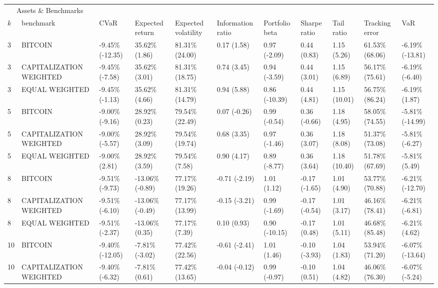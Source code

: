 \documentclass{article}
\begin{document}
\begin{landscape}
\begin{table}[H]
  \centering
  \begin{tabular}{p{0.4cm}|p{3cm}|p{1.65cm}|p{1.65cm}|p{1.65cm}|p{1.65cm}|p{1.65cm}|p{1.65cm}|p{1.65cm}|p{1.65cm}|p{1.65cm}}%
    \toprule
    \multicolumn{2}{c}{Assets \& Benchmarks}                   \\
    \cmidrule(r){1-2}
    $k$ & benchmark & CVaR & Expected return & Expected volatility&Information ratio&Portfolio beta&Sharpe ratio&Tail ratio&Tracking error&VaR\\
    \midrule
    3&BITCOIN&-9.45\% (-12.35)&35.62\% (1.86)&81.31\% (24.00)&0.17 (1.58)&0.97 (-2.09)&0.44 (0.83)&1.15 (5.26)&61.53\% (68.06)&-6.19\% (-13.81)
\\ 
3&CAPITALIZATION WEIGHTED&-9.45\% (-7.58)&35.62\% (3.01)&81.31\% (18.75)&0.74 (3.45)&0.94 (-3.59)&0.44 (3.01)&1.15 (6.89)&56.17\% (75.61)&-6.19\% (-6.40)
\\ 
3&EQUAL WEIGHTED&-9.45\% (-1.13)&35.62\% (4.66)&81.31\% (14.79)&0.94 (5.88)&0.86 (-10.39)&0.44 (4.81)&1.15 (10.01)&56.75\% (86.24)&-6.19\% (1.87)
\\ 
5&BITCOIN&-9.00\% (-9.16)&28.92\% (0.23)&79.54\% (22.49)&0.07 (-0.26)&0.99 (-0.54)&0.36 (-0.66)&1.18 (4.95)&58.05\% (74.55)&-5.81\% (-14.99)
\\ 
5&CAPITALIZATION WEIGHTED&-9.00\% (-5.57)&28.92\% (3.09)&79.54\% (19.74)&0.68 (3.35)&0.97 (-1.46)&0.36 (3.07)&1.18 (8.08)&51.37\% (73.08)&-5.81\% (-6.27)
\\ 
5&EQUAL WEIGHTED&-9.00\% (2.81)&28.92\% (3.59)&79.54\% (7.58)&0.90 (4.17)&0.89 (-8.77)&0.36 (3.64)&1.18 (10.40)&51.78\% (67.69)&-5.81\% (5.49)
\\ 
8&BITCOIN&-9.51\% (-9.73)&-13.06\% (-0.89)&77.17\% (19.26)&-0.71 (-2.19)&1.01 (1.12)&-0.17 (-1.65)&1.01 (4.90)&53.77\% (70.88)&-6.21\% (-12.70)
\\ 
8&CAPITALIZATION WEIGHTED&-9.51\% (-6.10)&-13.06\% (-0.49)&77.17\% (13.99)&-0.15 (-3.21)&0.99 (-1.69)&-0.17 (-0.54)&1.01 (3.17)&46.16\% (78.41)&-6.21\% (-6.81)
\\ 
8&EQUAL WEIGHTED&-9.51\% (-2.37)&-13.06\% (0.35)&77.17\% (7.39)&0.10 (0.93)&0.90 (-10.15)&-0.17 (0.48)&1.01 (5.11)&46.68\% (85.48)&-6.21\% (4.62)
\\ 
10&BITCOIN&-9.40\% (-12.05)&-7.81\% (-3.02)&77.42\% (22.56)&-0.61 (-2.41)&1.01 (1.46)&-0.10 (-3.93)&1.04 (1.83)&53.94\% (71.20)&-6.07\% (-13.64)
\\ 
10&CAPITALIZATION WEIGHTED&-9.40\% (-6.32)&-7.81\% (0.61)&77.42\% (13.65)&-0.04 (-0.12)&0.99 (-0.97)&-0.10 (0.51)&1.04 (4.82)&46.06\% (76.30)&-6.07\% (-5.24)

\end{tabular}
\end{table}
\end{landscape}
\end{document}
